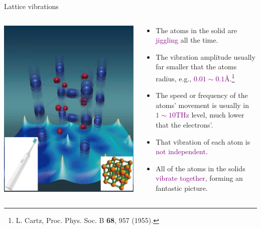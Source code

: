 \documentclass{beamer}
\begin{document}
\begin{frame}{Lattice vibrations}
  \begin{columns}
    \begin{column}{0.47\textwidth}
      \includegraphics[width=\textwidth]{figure/atomvib.png}
    \end{column}
    \begin{column}{0.5\textwidth}
      \begin{block}{}\begin{itemize}\small
        \item The atoms in the solid are \textcolor{purple}{jiggling} all the time.
        \item The vibration amplitude usually far smaller that the atoms radius, e.g., \textcolor{purple}{\(0.01\sim0.1\)\r{A}}.\footnote{\tiny L. Cartz, Proc. Phys. Soc. B \textbf{68}, 957 (1955).}
        \item The speed or frequency of the atoms' movement is usually in \textcolor{purple}{\( 1\sim 10\)THz} level, much lower that the electrons'.
        \item That vibration of each atom is \textcolor{purple}{not independent}. 
        \item All of the atoms in the solids \textcolor{purple}{vibrate together}, forming an fantastic picture.
      \end{itemize}\end{block}
    \end{column}
  \end{columns}
\end{frame}
\end{document}
